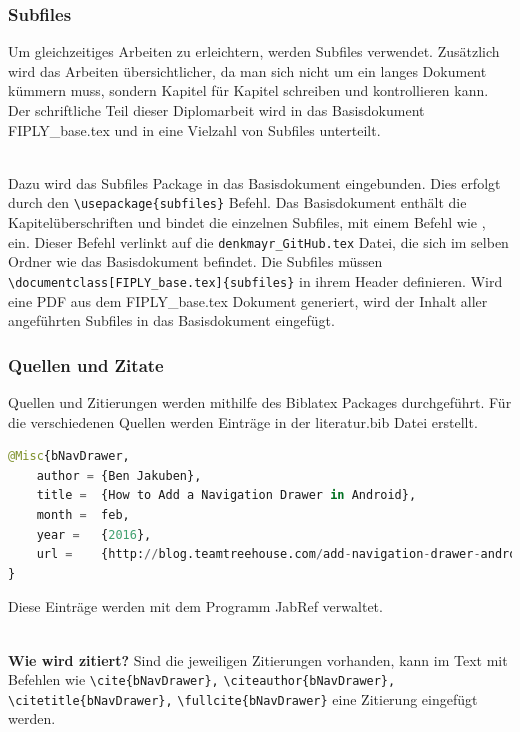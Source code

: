 \documentclass[FIPLY_base.tex]{subfiles}
\begin{document}
\subsubsection{Subfiles}
Um gleichzeitiges Arbeiten zu erleichtern, werden Subfiles verwendet.
Zusätzlich wird das Arbeiten übersichtlicher, da man sich nicht um ein langes Dokument kümmern muss, sondern Kapitel für Kapitel schreiben und kontrollieren kann.
Der schriftliche Teil dieser Diplomarbeit wird in das Basisdokument FIPLY\_base.tex und in eine Vielzahl von Subfiles unterteilt.

\ \\
Dazu wird das Subfiles Package in das Basisdokument eingebunden.
Dies erfolgt durch den \verb!\usepackage{subfiles}! Befehl.
Das Basisdokument enthält die Kapitelüberschriften und bindet die einzelnen Subfiles, mit einem Befehl wie \verb!!, ein.
Dieser Befehl verlinkt auf die \verb!denkmayr_GitHub.tex! Datei, die sich im selben Ordner wie das Basisdokument befindet.
Die Subfiles müssen \verb!\documentclass[FIPLY_base.tex]{subfiles}! in ihrem Header definieren.
Wird eine PDF aus dem FIPLY\_base.tex Dokument generiert, wird der Inhalt aller angeführten Subfiles in das Basisdokument eingefügt.

\subsubsection{Quellen und Zitate}
Quellen und Zitierungen werden mithilfe des Biblatex Packages durchgeführt.
Für die verschiedenen Quellen werden Einträge in der literatur.bib Datei erstellt.

\begin{lstlisting}[language=Python,frame=none, caption={Eintrag in die literatur.bib Datei},label=DescriptiveLabel]
@Misc{bNavDrawer,
	author = {Ben Jakuben},
	title =  {How to Add a Navigation Drawer in Android},
	month =  feb,
	year =   {2016},
	url =    {http://blog.teamtreehouse.com/add-navigation-drawer-android}
}
\end{lstlisting}
Diese Einträge werden mit dem Programm JabRef verwaltet.

\ \\
\textbf{Wie wird zitiert?} \newline
Sind die jeweiligen Zitierungen vorhanden, kann im Text mit Befehlen wie 
\verb!\cite{bNavDrawer},! \newline 
\verb!\citeauthor{bNavDrawer},! \newline 
\verb!\citetitle{bNavDrawer},! \newline
\verb!\fullcite{bNavDrawer}! \newline
eine Zitierung eingefügt werden. 
\end{document}
